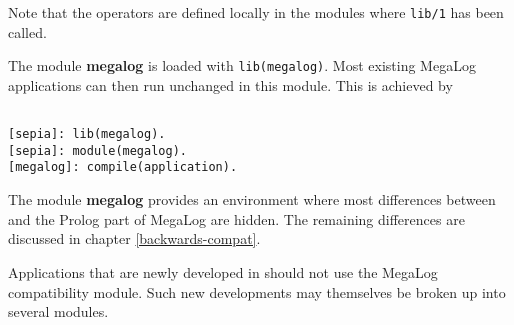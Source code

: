 Note that the operators
are defined locally in the modules where {\tt lib/1} has been called.

The module {\bf megalog} is loaded with {\tt lib(megalog)}.
Most existing MegaLog applications can then run unchanged in this
module. This is achieved by

\begin{verbatim}

[sepia]: lib(megalog).
[sepia]: module(megalog).
[megalog]: compile(application).

\end{verbatim}

The module {\bf megalog} provides an environment where most differences
between \eclipse and the Prolog part of MegaLog are hidden.
The remaining differences are discussed in chapter \ref{backwards-compat}.

Applications that are newly developed in \eclipse should not
use the MegaLog compatibility module. Such new developments
may themselves be broken up into several modules.
